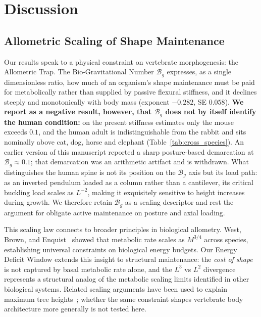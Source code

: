 \section{Discussion}

\subsection{Allometric Scaling of Shape Maintenance}

Our results speak to a physical constraint on vertebrate morphogenesis: the Allometric Trap. The Bio-Gravitational Number $\mathcal{B}_g$ expresses, as a single dimensionless ratio, how much of an organism's shape maintenance must be paid for metabolically rather than supplied by passive flexural stiffness, and it declines steeply and monotonically with body mass (exponent $-0.282$, SE $0.058$). \textbf{We report as a negative result, however, that $\mathcal{B}_g$ does not by itself identify the human condition:} on the present stiffness estimates only the mouse exceeds $0.1$, and the human adult is indistinguishable from the rabbit and sits nominally above cat, dog, horse and elephant (Table~\ref{tab:cross_species}). An earlier version of this manuscript reported a sharp posture-based demarcation at $\mathcal{B}_g \approx 0.1$; that demarcation was an arithmetic artifact and is withdrawn. What distinguishes the human spine is not its position on the $\mathcal{B}_g$ axis but its load path: as an inverted pendulum loaded as a column rather than a cantilever, its critical buckling load scales as $L^{-2}$, making it exquisitely sensitive to height increases during growth. We therefore retain $\mathcal{B}_g$ as a scaling descriptor and rest the argument for obligate active maintenance on posture and axial loading.

This scaling law connects to broader principles in biological allometry. West, Brown, and Enquist~\cite{west1997general} showed that metabolic rate scales as $M^{3/4}$ across species, establishing universal constraints on biological energy budgets. Our Energy Deficit Window extends this insight to structural maintenance: the \emph{cost of shape} is not captured by basal metabolic rate alone, and the $L^3$ vs $L^2$ divergence represents a structural analog of the metabolic scaling limits identified in other biological systems. Related scaling arguments have been used to explain maximum tree heights~\cite{niklas1994plant}; whether the same constraint shapes vertebrate body architecture more generally is not tested here.

